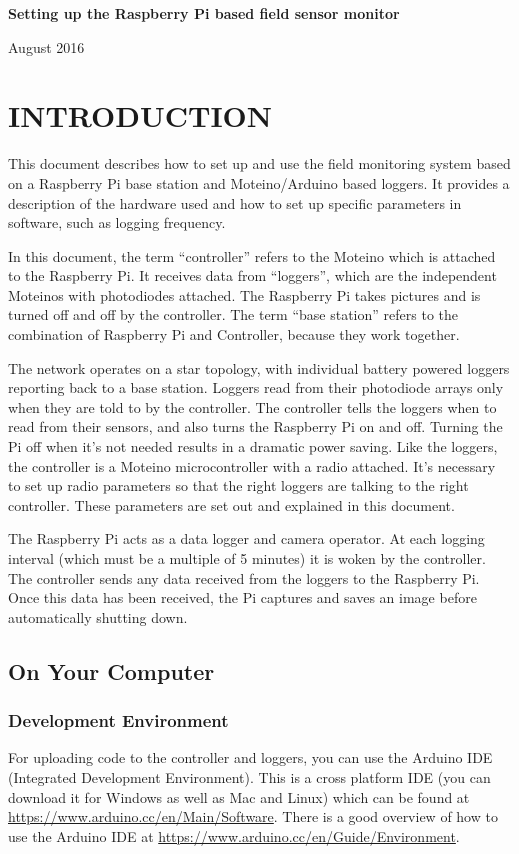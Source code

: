 \documentclass[10pt]{article}
\begin{document}
\begin{center}
\textbf{Setting up the Raspberry Pi based field sensor monitor}

August 2016
\end{center}
\newpage

\tableofcontents
\newpage

\section{INTRODUCTION}
This document describes how to set up and use the field monitoring system based on a Raspberry Pi base station and Moteino/Arduino based loggers. It provides a 
description of the hardware used and how to set up specific parameters in software, such as logging frequency.


In this document, the term ``controller'' refers to the Moteino which is attached to the Raspberry Pi. It receives data from ``loggers'', which are the independent
Moteinos with photodiodes attached. The Raspberry Pi takes pictures and is turned off and off by the controller. The term ``base station'' refers to the combination
of Raspberry Pi and Controller, because they work together.

The network operates on a star topology, with individual battery powered loggers reporting back to a base station. Loggers read from their photodiode arrays only when
they are told to by the controller. The controller tells the loggers when to read from their sensors, and also turns the Raspberry Pi on and off. Turning the Pi off when
it's not needed results in a dramatic power saving. Like the loggers, the controller is a Moteino microcontroller with a radio attached. It's necessary to set up radio
parameters so that the right loggers are talking to the right controller. These parameters are set out and explained in this document.

The Raspberry Pi acts as a data logger and camera operator. At each logging interval (which must be a multiple of 5 minutes) it is woken by the controller. The controller
sends any data received from the loggers to the Raspberry Pi. Once this data has been received, the Pi captures and saves an image before automatically shutting down.

\subsection{On Your Computer}

\subsubsection{Development Environment}
For uploading code to the controller and loggers, you can use the Arduino IDE (Integrated Development Environment). This is a cross platform IDE (you can download it for
Windows as well as Mac and Linux) which can be found at \url{https://www.arduino.cc/en/Main/Software}. There is a good overview of how to use the Arduino IDE at
\url{https://www.arduino.cc/en/Guide/Environment}. 
\end{document}
